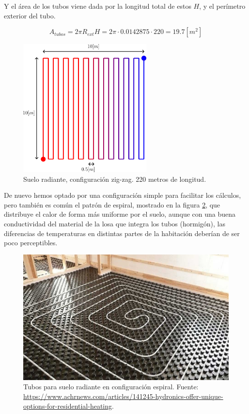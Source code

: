 Y el área de los tubos viene dada por la longitud total de estos $H$, y el
perímetro exterior del tubo.

\begin{equation}
	A_{tubos} = 2 \pi R_{ext} H = 2 \pi \cdot 0.0142875 \cdot 220 = 19.7[m^2]
\end{equation}


\begin{figure}[h] \centering
	\centering
	\includegraphics[width=0.6\textwidth]{./capitulos/resultados_discusion/images/esquema_tubos_suelo.png}
	\caption{Suelo radiante, configuración zig-zag. 220 metros de longitud.}
	\label{fig:esquema_tubos_suelo}
\end{figure}

De nuevo hemos optado por una configuración simple para facilitar los cálculos,
pero también es común el patrón de espiral, mostrado en la figura \ref{fig:spiral_pattern_floor},
que distribuye el calor de forma más uniforme por el suelo, aunque con una buena
conductividad del material de la losa que integra los tubos (hormigón), las diferencias de
temperaturas en distintas partes de la habitación deberían de ser poco perceptibles.

\begin{figure}[h] \centering
	\centering
	\includegraphics[width=1\textwidth]{./capitulos/resultados_discusion/images/spiral_pattern_floor.jpg}
	\caption{Tubos para suelo radiante en configuración espiral. Fuente: \url{https://www.achrnews.com/articles/141245-hydronics-offer-unique-options-for-residential-heating}.}
	\label{fig:spiral_pattern_floor}
\end{figure}


